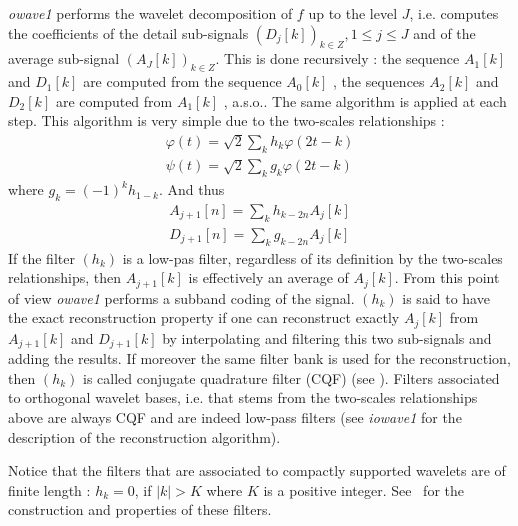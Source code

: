 {\em owave1} performs the wavelet decomposition of \( f \) up to the level \( J \), i.e. computes the coefficients of the detail sub-signals \( (D_{j}[k])_{k \in Z}, 1 \leq j \leq J \) and of the average sub-signal \( (A_{J}[k])_{k \in Z} \). This is done recursively : the sequence \( A_{1}[k] \) and \( D_{1}[k] \) are computed from the sequence \( A_{0}[k] \) , the sequences \( A_{2}[k] \)  and \( D_{2}[k] \) are computed from \( A_{1}[k] \) , a.s.o.. The same algorithm is applied at each step. This algorithm is very simple due to the two-scales relationships : 
\begin{eqnarray*}
\varphi(t) = \sqrt{2} \sum_{k} h_{k} \varphi(2t-k) \\
\psi(t) = \sqrt{2} \sum_{k} g_{k} \varphi(2t-k)
\end{eqnarray*}
where \( g_{k} = (-1)^{k} h_{1-k} \).
And thus
\begin{eqnarray*}
A_{j+1}[n] = \sum_{k} h_{k-2n} A_{j}[k] \\
D_{j+1}[n] = \sum_{k} g_{k-2n} A_{j}[k] 
\end{eqnarray*}
If the filter \( (h_{k}) \) is a low-pas filter, regardless of its definition by the two-scales relationships, then \( A_{j+1}[k] \) is effectively an average of \( A_{j}[k] \). From this point of view {\em owave1} performs a subband coding of the signal. 
\( (h_{k}) \) is said to have the exact reconstruction property if one can reconstruct exactly \( A_{j}[k] \) from \( A_{j+1}[k] \) and \( D_{j+1}[k] \) by interpolating and filtering this two sub-signals and adding the results. 
If moreover the same filter bank is used for the reconstruction, then  $(h_{k})$ is called conjugate quadrature filter (CQF) (see \cite{smith.barnwell:exact}). 
Filters associated to orthogonal wavelet bases, i.e. that stems from the two-scales relationships above are always CQF and are indeed low-pass filters (see {\em iowave1 } for the description of the reconstruction algorithm).

Notice that the filters that are associated to compactly supported wavelets are of finite length : \( h_{k} = 0 \), if \( |k| > K \) where \( K \) is a positive integer. 
See~\cite{daubechies:orthonormal} for the construction and properties of these filters. 

